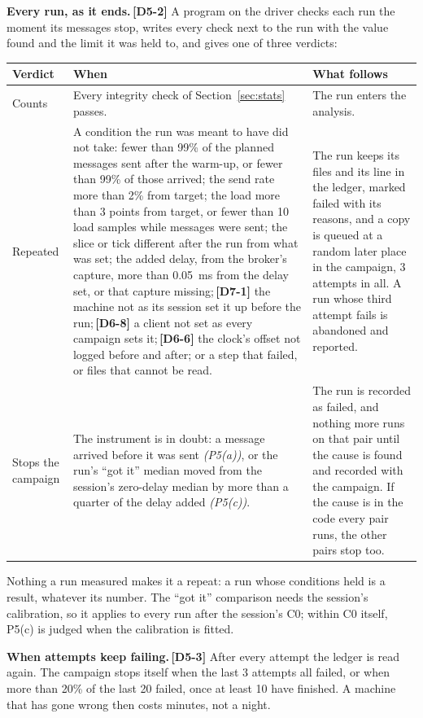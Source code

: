 \documentclass[11pt]{article}
\newcommand{\gl}[1]{{\color{soft}\itshape\small (#1)}}
\newcommand{\chgold}[1]{\,{\color{oldcol}\bfseries\footnotesize[#1]}}
\begin{document}
\textbf{Every run, as it ends.}\chgold{D5-2} A program on the driver checks each run the moment its messages stop, writes every check next to the run with the value found and the limit it was held to, and gives one of three verdicts:
{\small
\begin{longtable}{@{}>{\raggedright\arraybackslash}p{2.1cm} >{\raggedright\arraybackslash}p{8.3cm} >{\raggedright\arraybackslash}p{5.4cm}@{}}
\toprule
\textbf{Verdict} & \textbf{When} & \textbf{What follows} \\
\midrule
\endhead
Counts & Every integrity check of Section~\ref{sec:stats} passes. & The run enters the analysis. \\
Repeated & A condition the run was meant to have did not take: fewer than 99\% of the planned messages sent after the warm-up, or fewer than 99\% of those arrived; the send rate more than 2\% from target; the load more than 3 points from target, or fewer than 10 load samples while messages were sent; the slice or tick different after the run from what was set; the added delay, from the broker's capture, more than 0.05~ms from the delay set, or that capture missing;\chgold{D7-1} the machine not as its session set it up before the run;\chgold{D6-8} a client not set as every campaign sets it;\chgold{D6-6} the clock's offset not logged before and after; or a step that failed, or files that cannot be read. & The run keeps its files and its line in the ledger, marked failed with its reasons, and a copy is queued at a random later place in the campaign, 3 attempts in all. A run whose third attempt fails is abandoned and reported. \\
Stops the campaign & The instrument is in doubt: a message arrived before it was sent \gl{P5(a)}, or the run's ``got it'' median moved from the session's zero-delay median by more than a quarter of the delay added \gl{P5(c)}. & The run is recorded as failed, and nothing more runs on that pair until the cause is found and recorded with the campaign. If the cause is in the code every pair runs, the other pairs stop too. \\
\bottomrule
\end{longtable}}
Nothing a run measured makes it a repeat: a run whose conditions held is a result, whatever its number. The ``got it'' comparison needs the session's calibration, so it applies to every run after the session's C0; within C0 itself, P5(c) is judged when the calibration is fitted.

\textbf{When attempts keep failing.}\chgold{D5-3} After every attempt the ledger is read again. The campaign stops itself when the last 3 attempts all failed, or when more than 20\% of the last 20 failed, once at least 10 have finished. A machine that has gone wrong then costs minutes, not a night.
\end{document}
